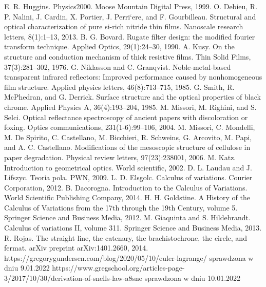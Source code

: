 \documentclass[a4paper,12pkt]{report}
\begin{document}
\begin{thebibliography}{25}
 E. R. Huggins. Physics2000. Moose Mountain Digital Press, 1999.
 O. Debieu, R. P. Nalini, J. Cardin, X. Portier, J. Perri`ere, and F. Gourbilleau. Structural and optical characterization of pure si-rich nitride thin films. Nanoscale research letters, 8(1):1–13, 2013.
 B. G. Bovard. Rugate filter design: the modified fourier transform technique. Applied Optics, 29(1):24–30, 1990. 
 A. Kusy. On the structure and conduction mechanism of thick resistive films. Thin Solid
Films, 37(3):281–302, 1976.
 G. Niklasson and C. Granqvist. Noble-metal-based transparent infrared reflectors: Improved performance caused by nonhomogeneous film structure. Applied physics letters, 46(8):713–715, 1985.
 G. Smith, R. McPhedran, and G. Derrick. Surface structure and the optical properties of black chrome. Applied Physics A, 36(4):193–204, 1985.
 M. Missori, M. Righini, and S. Selci. Optical reflectance spectroscopy of ancient papers with discoloration or foxing. Optics communications, 231(1-6):99–106, 2004.
 M. Missori, C. Mondelli, M. De Spirito, C. Castellano, M. Bicchieri, R. Schweins, G. Arcovito, M. Papi, and A. C. Castellano. Modifications of the mesoscopic structure of cellulose in paper degradation. Physical review letters, 97(23):238001, 2006.
 M. Katz. Introduction to geometrical optics. World scientific, 2002.
 D. L. Laudau and J. Lifszyc. Teoria pola. PWN, 2009.
 L. D. Elsgolc. Calculus of variations. Courier Corporation, 2012.
 B. Dacorogna. Introduction to the Calculus of Variations. World Scientific Publishing Company, 2014.
 H. H. Goldstine. A History of the Calculus of Variations from the 17th through the 19th Century, volume 5. Springer Science and Business Media, 2012.
 M. Giaquinta and S. Hildebrandt. Calculus of variations II, volume 311. Springer Science and Business Media, 2013.
  R. Rojas. The straight line, the catenary, the brachistochrone, the circle, and fermat. arXiv preprint arXiv:1401.2660, 2014.
 https://gregorygundersen.com/blog/2020/05/10/euler-lagrange/ sprawdzona w dniu 9.01.2022
 https://www.gregschool.org/articles-page-3/2017/10/30/derivation-of-snells-law-a8sne sprawdzona w dniu 10.01.2022

\end{thebibliography}
\end{document}
